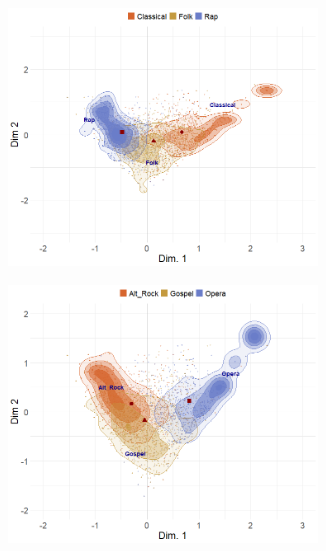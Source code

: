 \documentclass[12pt]{article}
\begin{document}
\begin{figure}[t]
    \captionsetup[subfigure]{font=footnotesize,labelfont=footnotesize}
    \centering
     \begin{subfigure}[b]{0.49\textwidth}
        \includegraphics[trim={0cm 0cm 0cm 0cm},clip, width=0.9\textwidth]{Plots/genre-proto-ex1.png}
            \caption{}
            \label{fig:}
    \end{subfigure}
     \begin{subfigure}[b]{0.49\textwidth}
        \includegraphics[trim={0cm 0cm 0cm 0cm},clip, width=0.9\textwidth]{Plots/genre-proto-ex2.png}
            \caption{}
            \label{fig:}
    \end{subfigure}
     \begin{subfigure}[b]{0.49\textwidth}

\end{subfigure}
\end{figure}
\end{document}
